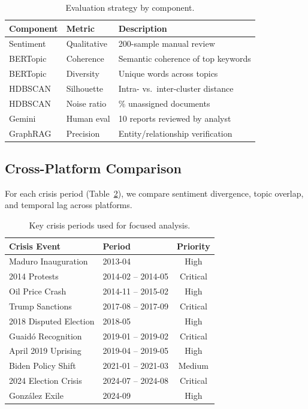 \documentclass[12pt, a4paper]{article}
\begin{document}
\begin{table}[H]
\centering
\caption{Evaluation strategy by component.}
\label{tab:eval}
\begin{tabular}{@{}llp{5.5cm}@{}}
\toprule
\textbf{Component} & \textbf{Metric} & \textbf{Description} \\
\midrule
Sentiment & Qualitative & 200-sample manual review \\[3pt]
BERTopic  & Coherence   & Semantic coherence of top keywords \\[3pt]
BERTopic  & Diversity   & Unique words across topics \\[3pt]
HDBSCAN   & Silhouette  & Intra- vs.\ inter-cluster distance \\[3pt]
HDBSCAN   & Noise ratio & \% unassigned documents \\[3pt]
Gemini    & Human eval  & 10 reports reviewed by analyst \\[3pt]
GraphRAG  & Precision   & Entity/relationship verification \\
\bottomrule
\end{tabular}
\end{table}

\subsection{Cross-Platform Comparison}

For each crisis period (Table~\ref{tab:flashpoints}), we compare sentiment divergence, topic overlap, and temporal lag across platforms.

\begin{table}[H]
\centering
\caption{Key crisis periods used for focused analysis.}
\label{tab:flashpoints}
\begin{tabular}{@{}llc@{}}
\toprule
\textbf{Crisis Event} & \textbf{Period} & \textbf{Priority} \\
\midrule
Maduro Inauguration        & 2013-04 & High \\
2014 Protests              & 2014-02 -- 2014-05 & Critical \\
Oil Price Crash            & 2014-11 -- 2015-02 & High \\
Trump Sanctions            & 2017-08 -- 2017-09 & Critical \\
2018 Disputed Election     & 2018-05 & High \\
Guaid\'{o} Recognition     & 2019-01 -- 2019-02 & Critical \\
April 2019 Uprising        & 2019-04 -- 2019-05 & High \\
Biden Policy Shift         & 2021-01 -- 2021-03 & Medium \\
2024 Election Crisis       & 2024-07 -- 2024-08 & Critical \\
Gonz\'{a}lez Exile         & 2024-09 & High \\
\bottomrule
\end{tabular}
\end{table}
\end{document}
